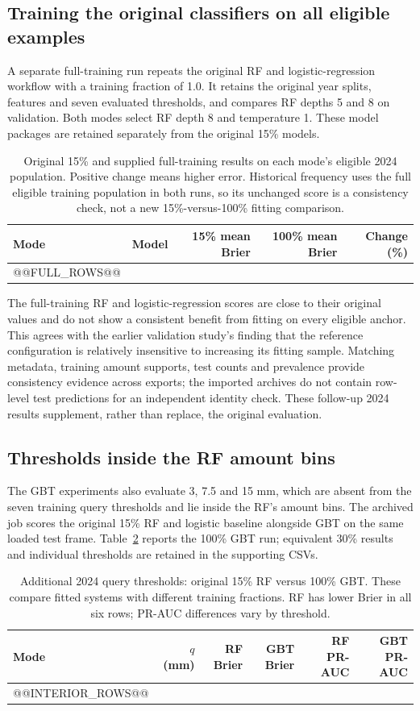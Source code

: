 \clearpage
\subsection{Training the original classifiers on all eligible examples}
A separate full-training run repeats the original RF and logistic-regression workflow with a training fraction of 1.0. It retains the original year splits, features and seven evaluated thresholds, and compares RF depths 5 and 8 on validation. Both modes select RF depth 8 and temperature 1. These model packages are retained separately from the original 15\% models.
\begin{table}[!ht]\centering\small
\begin{tabular}{llrrr}\toprule
Mode & Model & 15\% mean Brier & 100\% mean Brier & Change (\%)\\\midrule
@@FULL_ROWS@@
\bottomrule\end{tabular}
\caption{Original 15\% and supplied full-training results on each mode's eligible 2024 population. Positive change means higher error. Historical frequency uses the full eligible training population in both runs, so its unchanged score is a consistency check, not a new 15\%-versus-100\% fitting comparison.}\label{tab:fulltraining}
\end{table}
\FloatBarrier

The full-training RF and logistic-regression scores are close to their original values and do not show a consistent benefit from fitting on every eligible anchor. This agrees with the earlier validation study's finding that the reference configuration is relatively insensitive to increasing its fitting sample. Matching metadata, training amount supports, test counts and prevalence provide consistency evidence across exports; the imported archives do not contain row-level test predictions for an independent identity check. These follow-up 2024 results supplement, rather than replace, the original evaluation.

\subsection{Thresholds inside the RF amount bins}
The GBT experiments also evaluate 3, 7.5 and 15 mm, which are absent from the seven training query thresholds and lie inside the RF's amount bins. The archived job scores the original 15\% RF and logistic baseline alongside GBT on the same loaded test frame. Table~\ref{tab:interior} reports the 100\% GBT run; equivalent 30\% results and individual thresholds are retained in the supporting CSVs.
\begin{table}[!ht]\centering\small
\begin{tabular}{lrrrrr}\toprule
Mode & $q$ (mm) & RF Brier & GBT Brier & RF PR-AUC & GBT PR-AUC\\\midrule
@@INTERIOR_ROWS@@
\bottomrule\end{tabular}
\caption{Additional 2024 query thresholds: original 15\% RF versus 100\% GBT. These compare fitted systems with different training fractions. RF has lower Brier in all six rows; PR-AUC differences vary by threshold.}\label{tab:interior}
\end{table}
\FloatBarrier

